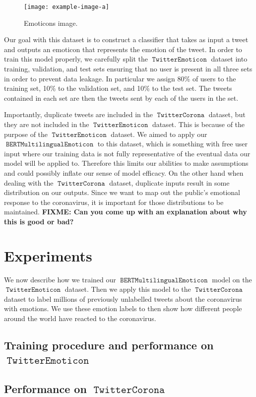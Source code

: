\documentclass[11pt]{article}
\newcommand{\fixme}[1]{\textbf{FIXME: {#1}}}
\DeclareMathOperator{\model}{\texttt{BERTMultilingualEmoticon}}
\DeclareMathOperator{\emoticon}{\texttt{TwitterEmoticon}}
\DeclareMathOperator{\corona}{\texttt{TwitterCorona}}
\begin{document}
\begin{figure}
    \centering
    \texttt{[image: example-image-a]}
    \caption{Emoticons image.}
    \label{fig:emoticons}
\end{figure}

Our goal with this dataset is to construct a classifier that takes as input a tweet and outputs an emoticon that represents the emotion of the tweet.
In order to train this model properly,
we carefully split the $\emoticon$ dataset into training, validation, and test sets ensuring that no user is present in all three sets in order to prevent data leakage.
In particular we assign 80\% of users to the training set, 10\% to the validation set, and 10\% to the test set.
The tweets contained in each set are then the tweets sent by each of the users in the set.

Importantly, duplicate tweets are included in the $\corona$ dataset,
but they are not included in the $\emoticon$ dataset.
This is because of the purpose of the $\emoticon$ dataset. 
We aimed to apply our $\model$ to this dataset,
which is something with free user input where our training data is not fully representative of the eventual data our model will be applied to.
Therefore this limits our abilities to make assumptions and could possibly inflate our sense of model efficacy.
On the other hand when dealing with the $\corona$ dataset,
duplicate inputs result in some distribution on our outputs.
Since we want to map out the public's emotional response to the coronavirus, it is important 
for those distributions to be maintained.
\fixme{Can you come up with an explanation about why this is good or bad?}

\section{Experiments}
\label{sec:experiments}

We now describe how we trained our $\model$ model on the $\emoticon$ dataset.
Then we apply this model to the $\corona$ dataset to label millions of previously unlabelled tweets about the coronavirus with emotions.
We use these emotion labels to then show how different people around the world have reacted to the coronavirus.

\subsection{Training procedure and performance on $\emoticon$}

\subsection{Performance on $\corona$}
\end{document}
